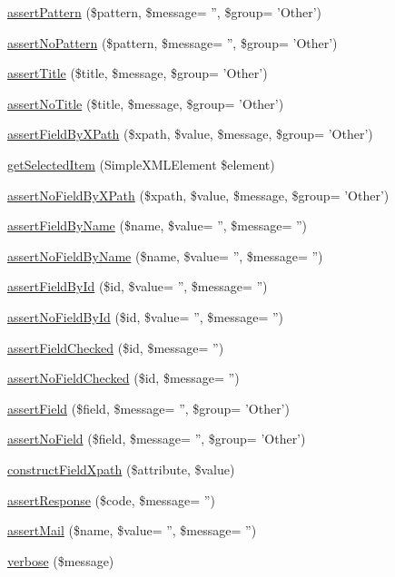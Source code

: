 \begin{DoxyCompactItemize}
\item 
\hyperlink{class_drupal_web_test_case_a5838fb78298156ab4de6a2ff5cdc4f8b}{assertPattern} (\$pattern, \$message= '', \$group= 'Other')
\item 
\hyperlink{class_drupal_web_test_case_a03d422398b9fc1f8844b7ff7fe468ed5}{assertNoPattern} (\$pattern, \$message= '', \$group= 'Other')
\item 
\hyperlink{class_drupal_web_test_case_ae51a8bfe2db3ab2e5a7373738f843624}{assertTitle} (\$title, \$message, \$group= 'Other')
\item 
\hyperlink{class_drupal_web_test_case_aa019d62a843ffe740b9456f316838924}{assertNoTitle} (\$title, \$message, \$group= 'Other')
\item 
\hyperlink{class_drupal_web_test_case_af7479a905b9933e14dcfb5585b03361f}{assertFieldByXPath} (\$xpath, \$value, \$message, \$group= 'Other')
\item 
\hyperlink{class_drupal_web_test_case_a4f24b7eddfb7d495f4ad8592f0b24929}{getSelectedItem} (SimpleXMLElement \$element)
\item 
\hyperlink{class_drupal_web_test_case_a8997cdd692056a6b4d1f79ced1dcf692}{assertNoFieldByXPath} (\$xpath, \$value, \$message, \$group= 'Other')
\item 
\hyperlink{class_drupal_web_test_case_ad2df17adcfef4a514e78c6a287022690}{assertFieldByName} (\$name, \$value= '', \$message= '')
\item 
\hyperlink{class_drupal_web_test_case_a323f24e8b6dcf37ae100ad7102ee85db}{assertNoFieldByName} (\$name, \$value= '', \$message= '')
\item 
\hyperlink{class_drupal_web_test_case_ad3779958ca911e96582177f110278111}{assertFieldById} (\$id, \$value= '', \$message= '')
\item 
\hyperlink{class_drupal_web_test_case_adbaec19474181965ddd70c6ee273d113}{assertNoFieldById} (\$id, \$value= '', \$message= '')
\item 
\hyperlink{class_drupal_web_test_case_aea0ec61d9b9f476c5b23cb0111bda4b7}{assertFieldChecked} (\$id, \$message= '')
\item 
\hyperlink{class_drupal_web_test_case_a23fbbe9b681b00419a0023ef07b48067}{assertNoFieldChecked} (\$id, \$message= '')
\item 
\hyperlink{class_drupal_web_test_case_a3955b3b90e4688bbd6f8fa0c5b47bfbe}{assertField} (\$field, \$message= '', \$group= 'Other')
\item 
\hyperlink{class_drupal_web_test_case_a450b5b0be6615e14e94415e087c31706}{assertNoField} (\$field, \$message= '', \$group= 'Other')
\item 
\hyperlink{class_drupal_web_test_case_afec52d7a3b6e492c3230dcc2b22bd7bb}{constructFieldXpath} (\$attribute, \$value)
\item 
\hyperlink{class_drupal_web_test_case_af414857cce5491ca01a2f7ea9d2d60bf}{assertResponse} (\$code, \$message= '')
\item 
\hyperlink{class_drupal_web_test_case_ad318f30726058caea940c1aeed1bd182}{assertMail} (\$name, \$value= '', \$message= '')
\item 
\hyperlink{class_drupal_web_test_case_a46e4ad5abf681eff423f6b6de5d9f361}{verbose} (\$message)
\end{DoxyCompactItemize}
